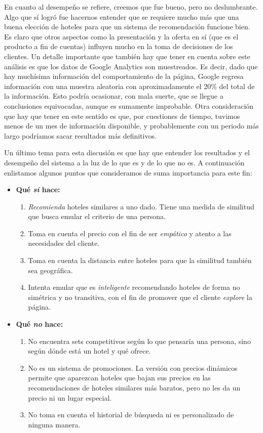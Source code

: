 \documentclass[12pt]{report}
\begin{document}
En cuanto al desempeño se refiere, creemos que fue bueno, pero no deslumbrante. Algo que sí logró fue hacernos entender que se requiere mucho más que una buena elección de hoteles para que un sistema de recomendación funcione bien. Es claro que otros aspectos como la presentación y la oferta en sí (que es el producto a fin de cuentas) influyen mucho en la toma de decisiones de los clientes. Un detalle importante que también hay que tener en cuenta sobre este análisis es que los datos de Google Analytics son muestreados. Es decir, dado que hay muchísima información del comportamiento de la página, Google regresa información con una muestra aleatoria con aproximadamente el 20\% del total de la información. Esto podría ocasionar, con mala suerte, que se llegue a conclusiones equivocadas, aunque es sumamente improbable. Otra consideración que hay que tener en este sentido es que, por cuestiones de tiempo, tuvimos menos de un mes de información disponible, y probablemente con un periodo más largo podríamos sacar resultados más definitivos.

Un último tema para esta discusión es que hay que entender los resultados y el desempeño del sistema a la luz de lo que es y de lo que no es. A continuación enlistamos algunos puntos que consideramos de suma importancia para este fin:
\begin{itemize}
	\item \textbf{Qué \emph{sí} hace:}
	\begin{enumerate}
		\item \emph{Recomienda} hoteles similares a uno dado. Tiene una medida de similitud que busca emular el criterio de una persona.
		\item Toma en cuenta el precio con el fin de ser \emph{empático} y atento a las necesidades del cliente.
		\item Toma en cuenta la distancia entre hoteles para que la similitud también sea geográfica.
		\item Intenta emular que es \emph{inteligente} recomendando hoteles de forma no simétrica y no transitiva, con el fin de promover que el cliente \emph{explore} la página.
	\end{enumerate}
	\item \textbf{Qué \emph{no} hace:}
	\begin{enumerate}
		\item No encuentra sets competitivos según lo que pensaría una persona, sino según dónde está un hotel y qué ofrece.
		\item No es un sistema de promociones. La versión con precios dinámicos permite que aparezcan hoteles que bajan sus precios en las recomendaciones de hoteles similares más baratos, pero no les da un precio ni un lugar especial.
		\item No toma en cuenta el historial de búsqueda ni es personalizado de ninguna manera.
	\end{enumerate}
\end{itemize}
\end{document}

